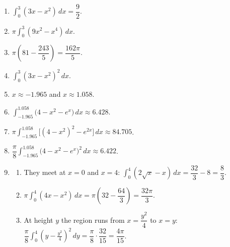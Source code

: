 \documentclass[11pt]{article}
\begin{document}
\newpage
\begin{solbox}
\begin{enumerate}[leftmargin=*,itemsep=4pt]
  \item $\displaystyle\int_{0}^{3}(3x-x^2)\,dx=\dfrac92$.
  \item $\pi\displaystyle\int_{0}^{3}(9x^2-x^4)\,dx$.
  \item $\pi\left(81-\dfrac{243}{5}\right)=\dfrac{162\pi}{5}$.
  \item $\displaystyle\int_{0}^{3}(3x-x^2)^2\,dx$.
  \item $x\approx-1.965$ and $x\approx1.058$.
  \item $\displaystyle\int_{-1.965}^{1.058}\big(4-x^2-e^{x}\big)\,dx\approx6.428$.
  \item $\pi\displaystyle\int_{-1.965}^{1.058}\big[(4-x^2)^2-e^{2x}\big]\,dx\approx84.705$.
  \item $\dfrac\pi8\displaystyle\int_{-1.965}^{1.058}\big(4-x^2-e^{x}\big)^2\,dx\approx6.422$.
  \item \begin{enumerate}[label=(\alph*),leftmargin=*,itemsep=3pt]
    \item They meet at $x=0$ and $x=4$: $\displaystyle\int_{0}^{4}(2\sqrt x-x)\,dx=\dfrac{32}{3}-8=\dfrac83$.
    \item $\pi\displaystyle\int_{0}^{4}(4x-x^2)\,dx=\pi\left(32-\dfrac{64}{3}\right)=\dfrac{32\pi}{3}$.
    \item At height $y$ the region runs from $x=\dfrac{y^2}{4}$ to $x=y$: $\dfrac\pi8\displaystyle\int_{0}^{4}\left(y-\tfrac{y^2}{4}\right)^2\,dy=\dfrac\pi8\cdot\dfrac{32}{15}=\dfrac{4\pi}{15}$.
  \end{enumerate}
\end{enumerate}
\end{solbox}
\end{document}
